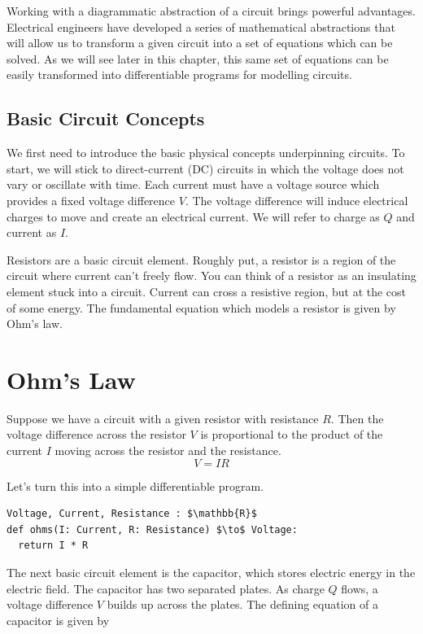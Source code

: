 \documentclass[book.tex]{subfiles}
\begin{document}
Working with a diagrammatic abstraction of a circuit brings powerful advantages. Electrical engineers have developed a series of mathematical abstractions that will allow us to transform a given circuit into a set of equations which can be solved. As we will see later in this chapter, this same set of equations can be easily transformed into differentiable programs for modelling circuits.

\subsection{Basic Circuit Concepts}

We first need to introduce the basic physical concepts underpinning circuits. To start, we will stick to direct-current (DC) circuits in which the voltage does not vary or oscillate with time. Each current must have a voltage source which provides a fixed voltage difference $V$. The voltage difference will induce electrical charges to move and create an electrical current. We will refer to charge as $Q$ and current as $I$.

Resistors are a basic circuit element. Roughly put, a resistor is a region of the circuit where current can't freely flow. You can think of a resistor as an insulating element stuck into a circuit. Current can cross a resistive region, but at the cost of some energy. The fundamental equation which models a resistor is given by Ohm's law.

\section{Ohm's Law}
Suppose we have a circuit with a given resistor with resistance $R$. Then the voltage difference across the resistor $V$ is proportional to the product of the current $I$ moving across the resistor and the resistance.
\begin{equation}
    V = IR
\end{equation}

Let's turn this into a simple differentiable program.

\begin{lstlisting}
Voltage, Current, Resistance : $\mathbb{R}$
def ohms(I: Current, R: Resistance) $\to$ Voltage:
  return I * R
\end{lstlisting}
The next basic circuit element is the capacitor, which stores electric energy in the electric field. The capacitor has two separated plates. As charge $Q$ flows, a voltage difference $V$ builds up across the plates. The defining equation of a capacitor is given by
\end{document}
